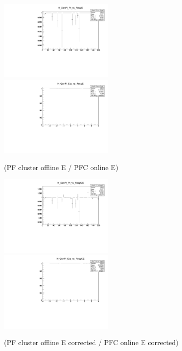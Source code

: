 \begin{figure}
\includegraphics[width=0.495\textwidth]{./ECAL_plots/Prod6/PU/H_GenPi_Pt_vs_RespE.pdf}
\includegraphics[width=0.495\textwidth]{./ECAL_plots/Prod6/PU/H_GenPi_Eta_vs_RespE.pdf}
\caption{(PF cluster offline E / PFC online E)}
\end{figure}

\begin{figure}
\includegraphics[width=0.495\textwidth]{./ECAL_plots/Prod6/PU/H_GenPi_Pt_vs_RespCE.pdf}
\includegraphics[width=0.495\textwidth]{./ECAL_plots/Prod6/PU/H_GenPi_Eta_vs_RespCE.pdf}
\caption{(PF cluster offline E corrected / PFC online E corrected)}
\end{figure}       
